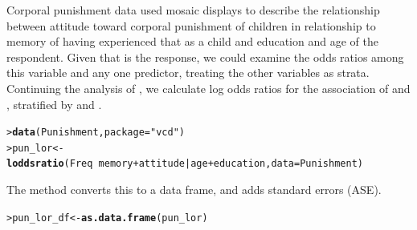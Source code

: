 \documentclass[10pt,krantz2]{krantz}\usepackage[]{graphicx}\usepackage[]{color}
\makeatletter
\newcommand{\hlstr}[1]{\textcolor[rgb]{0.192,0.494,0.8}{#1}}%
\newcommand{\hlopt}[1]{\textcolor[rgb]{0,0,0}{#1}}%
\newcommand{\hlstd}[1]{\textcolor[rgb]{0.345,0.345,0.345}{#1}}%
\newcommand{\hlkwb}[1]{\textcolor[rgb]{0.69,0.353,0.396}{#1}}%
\newcommand{\hlkwc}[1]{\textcolor[rgb]{0.333,0.667,0.333}{#1}}%
\newcommand{\hlkwd}[1]{\textcolor[rgb]{0.737,0.353,0.396}{\textbf{#1}}}%
\newenvironment{kframe}{%
 \def\at@end@of@kframe{}%
 \ifinner\ifhmode%
  \def\at@end@of@kframe{\end{minipage}}%
  \begin{minipage}{\columnwidth}%
 \fi\fi%
 \def\FrameCommand##1{\hskip\@totalleftmargin \hskip-\fboxsep
 \colorbox{shadecolor}{##1}\hskip-\fboxsep
     \hskip-\linewidth \hskip-\@totalleftmargin \hskip\columnwidth}%
 \MakeFramed {\advance\hsize-\width
   \@totalleftmargin\z@ \linewidth\hsize
   \@setminipage}}%
 {\par\unskip\endMakeFramed%
 \at@end@of@kframe}
\newenvironment{knitrout}{}{} %
\renewenvironment{knitrout}{\small\renewcommand{\baselinestretch}{.85}}{} %
\makeatother
\begin{document}
\begin{Example}[punish2]{Corporal punishment data}
 used mosaic displays to describe the relationship between attitude toward corporal punishment of children
in relationship to memory of having experienced that as a child and education and age of the respondent.
Given that  is the response, we could examine the odds ratios among this variable and any one predictor,
treating the other variables as strata.
Continuing the analysis of , we calculate log odds ratios for
the association of  and , stratified by  and .
\begin{knitrout}
\color{fgcolor}\begin{kframe}
\begin{alltt}
\hlstd{> }\hlkwd{data}\hlstd{(Punishment,} \hlkwc{package}\hlstd{=}\hlstr{"vcd"}\hlstd{)}
\hlstd{> }\hlstd{pun_lor} \hlkwb{<-} \hlkwd{loddsratio}\hlstd{(Freq} \hlopt{~} \hlstd{memory} \hlopt{+} \hlstd{attitude} \hlopt{|} \hlstd{age} \hlopt{+} \hlstd{education,} \hlkwc{data} \hlstd{= Punishment)}
\end{alltt}
\end{kframe}
\end{knitrout}
The  method converts this to a data frame, and adds standard errors (ASE).
\begin{knitrout}
\color{fgcolor}\begin{kframe}
\begin{alltt}
\hlstd{> }\hlstd{pun_lor_df} \hlkwb{<-} \hlkwd{as.data.frame}\hlstd{(pun_lor)}
\end{alltt}
\end{kframe}
\end{knitrout}



\end{Example}
\end{document}
